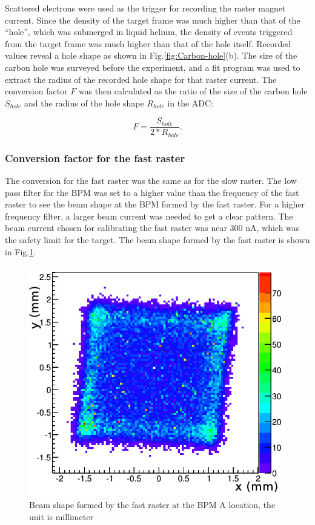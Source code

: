 \documentclass[english,review,number,sort&compress]{elsarticle}
\begin{document}
 Scattered electrons were used as the trigger for recording the raster magnet current. Since the density of the target frame was much higher than that of the ``hole'', which was submerged in liquid helium, the density of events triggered from the target frame was much higher than that of the hole itself. Recorded values reveal a hole shape as shown in Fig.\ref{fig:Carbon-hole}(b). The size of the carbon hole was surveyed before the experiment, and a fit program was used to extract the radius of the recorded hole shape for that raster current. The conversion factor $F$ was then calculated as the ratio of the size of the carbon hole $S_{hole}$ and the radius of the hole shape $R_{hole}$ in the ADC:

\begin{equation}
F=\frac{S_{hole}}{2*R_{hole}}.\label{eq:convfactorhole}
\end{equation}



\subsubsection{Conversion factor for the fast raster}

The conversion for the fast raster was the same as for the slow raster. The low pass filter for the BPM was set to a higher value than the frequency of the fast raster to see the beam shape at the BPM formed by the fast raster. For a higher frequency filter, a larger beam current was needed to get a clear pattern. The beam current chosen for calibrating the fast raster was near 300 nA, which was the safety limit for the target. The beam shape formed by the fast raster is shown in Fig.\ref{fig:fastrasteratbpm}. 
\begin{figure}[tbph]
\begin{centering}
\includegraphics[width=0.5\columnwidth]{fastrasteratbpm} 
\par\end{centering}

\protect\caption{\label{fig:fastrasteratbpm}Beam shape formed by the fast raster at the BPM A location, the unit is millimeter}
\end{figure}
\end{document}
